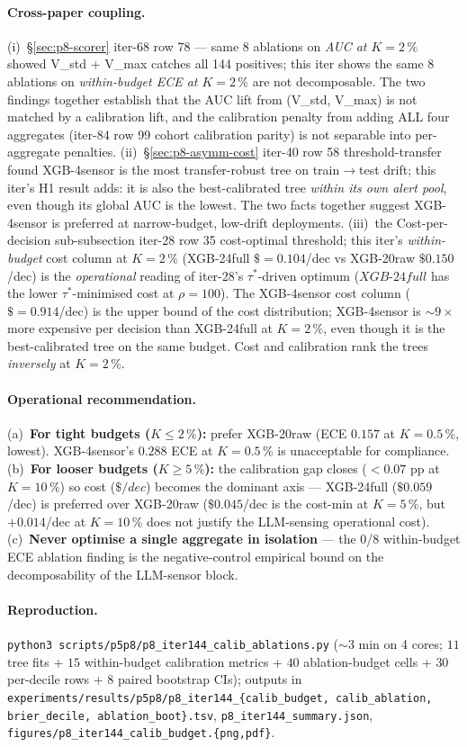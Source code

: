 \paragraph{Cross-paper coupling.}
(i)~\S\ref{sec:p8-scorer} iter-68 row 78 --- same 8 ablations on
\emph{AUC at $K{=}2\,\%$} showed V\_std + V\_max catches all 144
positives; this iter shows the same 8 ablations on
\emph{within-budget ECE at $K{=}2\,\%$} are not decomposable. The
two findings together establish that the AUC lift from
(V\_std, V\_max) is not matched by a calibration lift, and the
calibration penalty from adding ALL four aggregates (iter-84 row
99 cohort calibration parity) is not separable into per-aggregate
penalties. (ii)~\S\ref{sec:p8-asymm-cost} iter-40 row
58 threshold-transfer found XGB-4sensor is the most
transfer-robust tree on train$\to$test drift; this iter's H1
result adds: it is also the best-calibrated tree \emph{within its
own alert pool}, even though its global AUC is the lowest. The
two facts together suggest XGB-4sensor is preferred at
narrow-budget, low-drift deployments. (iii)~the Cost-per-decision
sub-subsection iter-28 row 35 cost-optimal threshold; this iter's
\emph{within-budget} cost column at $K{=}2\,\%$ (XGB-24full
$\${=}0.104$/dec vs XGB-20raw $\$0.150$/dec) is the
\emph{operational} reading of iter-28's $\tau^*$-driven optimum
($XGB$-$24full$ has the lower $\tau^*$-minimised cost at
$\rho{=}100$). The XGB-4sensor cost column ($\${=}0.914$/dec) is
the upper bound of the cost distribution; XGB-4sensor is $\sim\!9\times$
more expensive per decision than XGB-24full at $K{=}2\,\%$, even
though it is the best-calibrated tree on the same budget. Cost
and calibration rank the trees \emph{inversely} at $K{=}2\,\%$.

\paragraph{Operational recommendation.}
(a)~\textbf{For tight budgets ($K \leq 2\,\%$):} prefer XGB-20raw
(ECE $0.157$ at $K{=}0.5\,\%$, lowest). XGB-4sensor's $0.288$ ECE
at $K{=}0.5\,\%$ is unacceptable for compliance. (b)~\textbf{For
looser budgets ($K \geq 5\,\%$):} the calibration gap closes
($<0.07$ pp at $K{=}10\,\%$) so cost ($\$/dec$) becomes the
dominant axis --- XGB-24full ($\$0.059$/dec) is preferred over
XGB-20raw ($\$0.045$/dec is the cost-min at $K{=}5\,\%$, but
$+0.014$/dec at $K{=}10\,\%$ does not justify the LLM-sensing
operational cost). (c)~\textbf{Never optimise a single
aggregate in isolation} --- the 0/8 within-budget ECE ablation
finding is the negative-control empirical bound on the
decomposability of the LLM-sensor block.

\paragraph{Reproduction.}
\texttt{python3 scripts/p5p8/p8\_iter144\_calib\_ablations.py}
(${\sim}3$ min on 4 cores; $11$ tree fits + $15$ within-budget
calibration metrics + $40$ ablation-budget cells + $30$ per-decile
rows + $8$ paired bootstrap CIs); outputs in
\texttt{experiments/results/p5p8/p8\_iter144\_\{calib\_budget,
calib\_ablation, brier\_decile, ablation\_boot\}.tsv},
\texttt{p8\_iter144\_summary.json},
\texttt{figures/p8\_iter144\_calib\_budget.\{png,pdf\}}.
